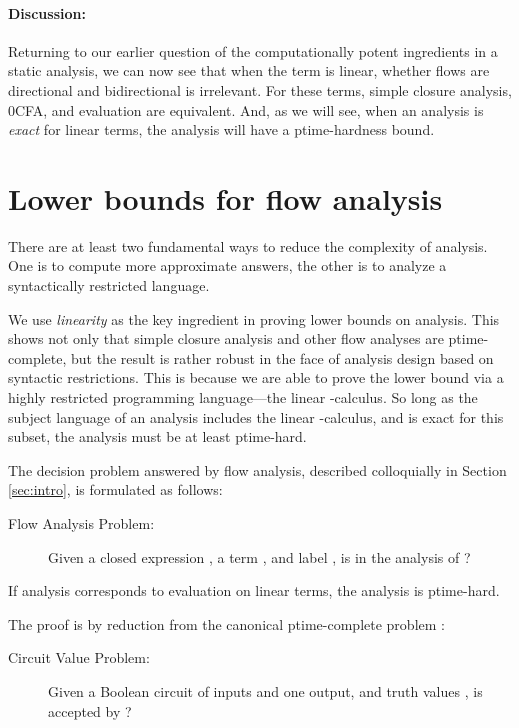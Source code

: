 \documentclass{llncs}
\newcommand\ptime{{\sc ptime}}
\begin{document}
\paragraph{Discussion:}

Returning to our earlier question of the computationally potent
ingredients in a static analysis, we can now see that when the term is
linear, whether flows are directional and bidirectional is irrelevant.
For these terms, simple closure analysis, 0CFA, and evaluation are
equivalent.  And, as we will see, when an analysis is {\em exact} for
linear terms, the analysis will have a \ptime-hardness bound.


\section{Lower bounds for flow analysis}
\label{sec:circuits}

There are at least two fundamental ways to reduce the complexity of
analysis.  One is to compute more approximate answers, the other is to
analyze a syntactically restricted language.

We use {\em linearity} as the key ingredient in proving lower bounds
on analysis.  This shows not only that simple closure analysis and
other flow analyses are \ptime-complete, but the result is rather
robust in the face of analysis design based on syntactic restrictions.
This is because we are able to prove the lower bound via a highly
restricted programming language---the linear -calculus.  So
long as the subject language of an analysis includes the linear
-calculus, and is exact for this subset, the analysis must be
at least \ptime-hard.

The decision problem answered by flow analysis, described colloquially
in Section \ref{sec:intro}, is formulated as follows:
\begin{description}
\item[Flow Analysis Problem:] Given a closed expression , a term
, and label , is  in the analysis of ?
\end{description}

\begin{theorem}
If analysis corresponds to evaluation on linear terms, the analysis is
\ptime-hard.
\end{theorem}
The proof is by reduction from the canonical \ptime-complete problem
\cite{ladner-75}:
\begin{description}
\item[Circuit Value Problem:] Given a Boolean circuit  of 
inputs and one output, and truth values , is
 accepted by ?
\end{description}
\end{document}
